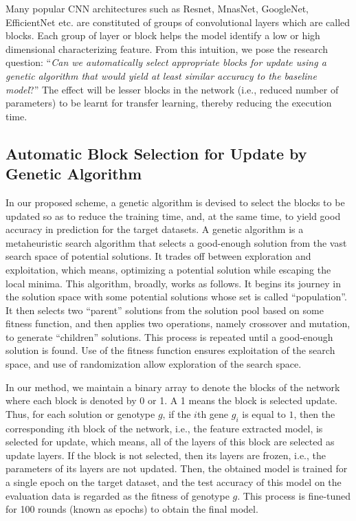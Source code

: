 \documentclass[a4paper,fleqn]{cas-sc}
\begin{document}
Many popular CNN architectures such as Resnet, MnasNet, GoogleNet, EfficientNet etc. are constituted of groups of convolutional layers which are called blocks. Each group of layer or block helps the model identify a low or high dimensional characterizing feature. From this intuition, we pose the research question: ``\emph{Can we automatically select appropriate blocks for update using a genetic algorithm that would yield at least similar accuracy to the baseline model}?'' The effect will be  lesser blocks in the network (i.e., reduced number of parameters) to be learnt for transfer learning, thereby reducing the execution time.


\subsection{Automatic Block Selection for Update by Genetic Algorithm}
In our proposed scheme, a genetic algorithm is devised to select the blocks to be updated so as to reduce the training time, and, at the same time, to yield good   accuracy in prediction for the target datasets. A genetic algorithm is a metaheuristic search algorithm that selects a good-enough solution from the vast search space of potential solutions. It trades off between exploration and exploitation, which means, optimizing a potential solution while escaping the local minima. This algorithm, broadly, works as follows. It begins its journey in the solution space with some potential solutions whose set is called ``population''. It then selects two ``parent'' solutions from the solution pool based on some fitness function, and then applies two operations, namely crossover and mutation, to generate ``children'' solutions. This process is repeated until a good-enough solution is found. Use of the fitness function ensures exploitation of the search space, and use of randomization allow exploration of the search space.

In our method, we maintain a binary array to denote the blocks of the network where each block is denoted by 0 or 1. A 1 means the block is selected update. Thus, for each solution or genotype $g$, if the $i$th gene $g_i$ is equal to $1$, then the corresponding $i$th block of the network, i.e., the feature extracted model, is selected for update, which means, all of the layers of this block are selected as update layers. If the block is not selected, then its layers are frozen, i.e., the parameters of its layers are not updated. Then, the obtained model is trained for a single epoch on the target dataset, and the test accuracy of this model on the evaluation data is regarded as the fitness of genotype $g$. This process is fine-tuned for 100 rounds (known as epochs) to obtain the final model. %
\end{document}
